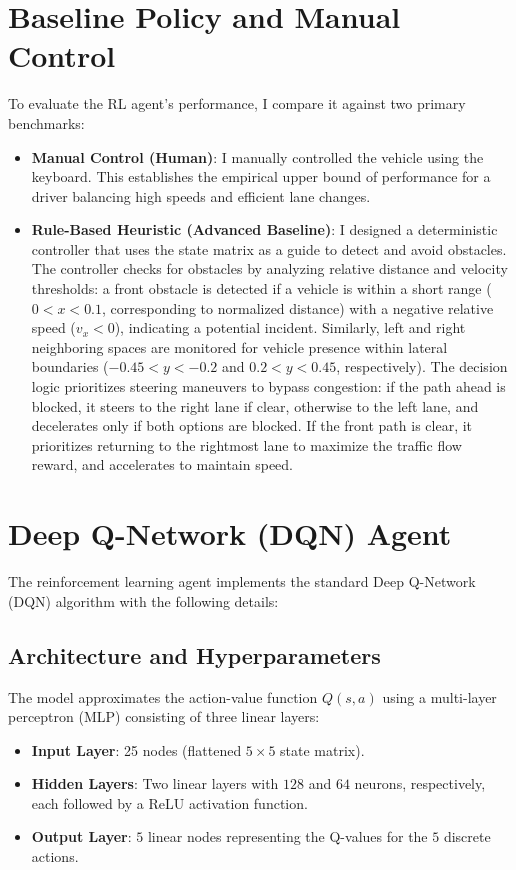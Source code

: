 \documentclass{article}
\begin{document}
\section{Baseline Policy and Manual Control}
To evaluate the RL agent's performance, I compare it against two primary benchmarks:
\begin{itemize}
    \item \textbf{Manual Control (Human)}: I manually controlled the vehicle using the keyboard. This establishes the empirical upper bound of performance for a driver balancing high speeds and efficient lane changes.
    \item \textbf{Rule-Based Heuristic (Advanced Baseline)}: I designed a deterministic controller that uses the state matrix as a guide to detect and avoid obstacles. The controller checks for obstacles by analyzing relative distance and velocity thresholds: a front obstacle is detected if a vehicle is within a short range ($0 < x < 0.1$, corresponding to normalized distance) with a negative relative speed ($v_x < 0$), indicating a potential incident. Similarly, left and right neighboring spaces are monitored for vehicle presence within lateral boundaries ($-0.45 < y < -0.2$ and $0.2 < y < 0.45$, respectively). The decision logic prioritizes steering maneuvers to bypass congestion: if the path ahead is blocked, it steers to the right lane if clear, otherwise to the left lane, and decelerates only if both options are blocked. If the front path is clear, it prioritizes returning to the rightmost lane to maximize the traffic flow reward, and accelerates to maintain speed.
\end{itemize}

\section{Deep Q-Network (DQN) Agent}
The reinforcement learning agent implements the standard Deep Q-Network (DQN) algorithm \cite{mnih2015human} with the following details:

\subsection{Architecture and Hyperparameters}
The model approximates the action-value function $Q(s, a)$ using a multi-layer perceptron (MLP) consisting of three linear layers:
\begin{itemize}
    \item \textbf{Input Layer}: 25 nodes (flattened $5 \times 5$ state matrix).
    \item \textbf{Hidden Layers}: Two linear layers with $128$ and $64$ neurons, respectively, each followed by a ReLU activation function.
    \item \textbf{Output Layer}: $5$ linear nodes representing the Q-values for the $5$ discrete actions.
\end{itemize}
\end{document}
